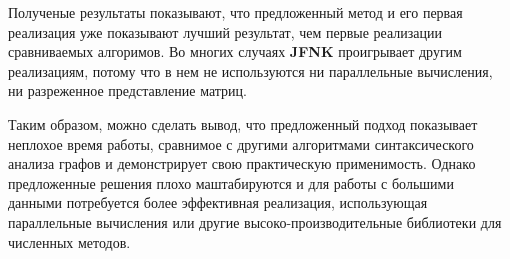 \documentclass[12pt]{matmex-diploma-custom}
\begin{document}
\begin{table*}[t]
\caption{Результаты сравнения с матричным алгоритмом для запроса 2 (в мс)}
\label{tbl2}
\centering{}
\end{table*}

Полученые результаты показывают, что предложенный метод и его первая реализация уже показывают лучший результат, чем первые реализации сравниваемых алгоримов. Во многих случаях \textbf{JFNK} проигрывает другим реализациям, потому что в нем не используются ни параллельные вычисления, ни разреженное представление матриц. 

Таким образом, можно сделать вывод, что предложенный подход показывает неплохое время работы, сравнимое с другими алгоритмами синтаксического анализа графов и демонстрирует свою практическую применимость. Однако предложенные решения плохо маштабируются и для работы с большими данными потребуется более эффективная реализация, использующая параллельные вычисления или другие высоко-производительные библиотеки для численных методов. 

       
\end{document}
